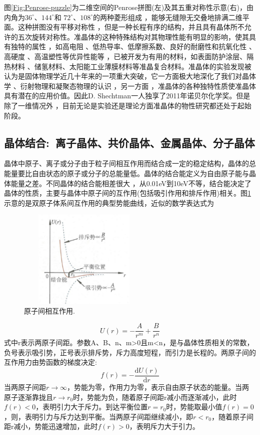 图\ref{Fig:Penrose-puzzle}为二维空间的Penrose拼图(左)及其五重对称性示意(右)，由内角为$36^{\circ}$、$144^{\circ}$和 $72^{\circ}$、$108^{\circ}$的两种菱形组成 ，能够无缝隙无交叠地排满二维平面。这种拼图没有平移对称性 ，但是一种长程有序的结构，并且具有晶体所不允许的五次旋转对称性。准晶体的这种特殊结构对其物理性能有明显的影响，使其具有独特的属性 ，如高电阻 、低热导率、低摩擦系数、良好的耐磨性和抗氧化性 、高硬度 、高温塑性等优异性能等 ，已被开发为有用的材料，如表面防护涂层、隔热材料 、储氢材料、太阳能工业薄膜材料等准晶复合材料。准晶体的实验发现被认为是固体物理学近几十年来的一项重大突破，它一方面极大地深化了我们对晶体学 、衍射物理和凝聚态物理的认识 ，另一方面 ，准晶体的各种独特性质使准晶体具有潜在的应用价值。因此D. Shechtman一人独享了2011年诺贝尔化学奖。但是除了一维情况外 ，目前无论是实验还是理论方面准晶体的物性研究都还处于起始阶段。

\subsection{晶体结合:~离子晶体、共价晶体、金属晶体、分子晶体}
晶体中原子、离子或分子由于粒子间相互作用而结合成一定的稳定结构，晶体的总能量要比自由状态的原子或分子的总能量低。晶体的结合能定义为自由原子能与晶体能量之差。不同晶体的结合能相差很大 ，从0.01eV到10eV不等，结合能决定了晶体的性质，主要与晶体中原子间的互作用(包括吸引作用和排斥作用)相关。图\ref{Fig:SSI-04}示意的是双原子体系间互作用的典型势能曲线，近似的数学表达式为
\begin{figure}[h!]
\centering
\vspace*{-0.1in}
\includegraphics[height=1.85in,width=2.5in,viewport=0 0 50 40,clip]{Figures/Interaction-2_Atoms.png}
\caption{\small \textrm{原子间相互作用.}}%
\label{Fig:SSI-04}
\end{figure}
\begin{equation}
	U(r)=-\dfrac{A}{r^m}+\dfrac{B}{r^n}
	\label{eq:SSI-01}
\end{equation}
式中r表示两原子间距。参数A、B、n、m>0且m<n，是与晶体性质相关的常数，负号表示吸引势，正号表示排斥势，斥力高度短程，而引力是长程的。两原子间的互作用力由势函数的梯度决定:
\begin{equation}
	f(r)=-\dfrac{\mathrm{d}U(r)}{\mathrm{d}r}
	\label{eq:SSI-02}
\end{equation}
当两原子间距$r\rightarrow\infty$，势能为零，作用力为零，表示自由原子状态的能量。当两原子逐渐靠拢且$r\rightarrow r_0$时，势能为负，随着原子间距r减小而逐渐减小，此时$f(r)<0$，表明引力大于斥力。到达平衡位置$r=r_0$时，势能取最小值$f(r)=0$，则，表明引力与斥力达到平衡。当两原子间距继续减小，即$r<r_0$，随着原子间距r减小，势能迅速增加，此时$f(r)>0$，表明斥力大于引力。

